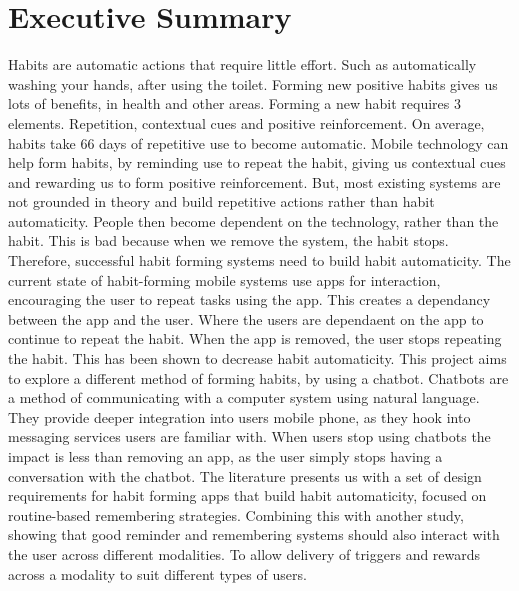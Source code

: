\section*{Executive Summary}

Habits are automatic actions that require little effort. Such as automatically washing your hands, after using the toilet. Forming new positive habits gives us lots of benefits, in health and other areas. Forming a new habit requires 3 elements. Repetition, contextual cues and positive reinforcement. On average, habits take 66 days of repetitive use to become automatic.\newline
\newline
Mobile technology can help form habits, by reminding use to repeat the habit, giving us contextual cues and rewarding us to form positive reinforcement. But, most existing systems are not grounded in theory and build repetitive actions rather than habit automaticity. People then become dependent on the technology, rather than the habit. This is bad because when we remove the system, the habit stops. Therefore, successful habit forming systems need to build habit automaticity.\newline
\newline
The current state of habit-forming mobile systems use apps for interaction, encouraging the user to repeat tasks using the app. This creates a dependancy between the app and the user. Where the users are dependaent on the app to continue to repeat the habit. When the app is removed, the user stops repeating the habit. This has been shown to decrease habit automaticity.\newline
\newline
This project aims to explore a different method of forming habits, by using a chatbot.\newline
Chatbots are a method of communicating with a computer system using natural language. They provide deeper integration into users mobile phone, as they hook into messaging services users are familiar with. When users stop using chatbots the impact is less than removing an app, as the user simply stops having a conversation with the chatbot.\newline
\newline
The literature presents us with a set of design requirements for habit forming apps that build habit automaticity, focused on routine-based remembering strategies. Combining this with another study, showing that good reminder and remembering systems should also interact with the user across different modalities. To allow delivery of triggers and rewards across a modality to suit different types of users.\newline
